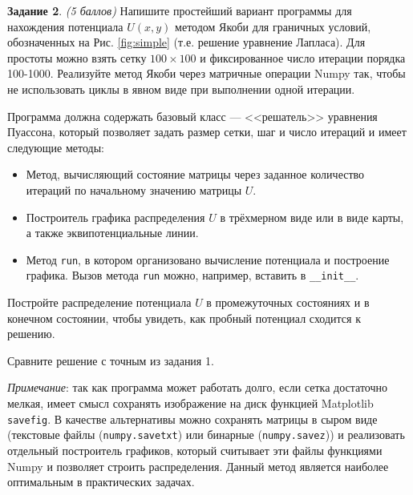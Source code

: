 \documentclass[12pt]{article}
\newcommand{\task}[2]{\vspace{6pt}
\textbf{Задание #1}. #2 \vspace{6pt}}
\begin{document}
\task{2}{\textit{(5 баллов)} Напишите простейший вариант программы для нахождения потенциала $U(x,y)$ методом Якоби для граничных условий, обозначенных на Рис. \ref{fig:simple} (т.е. решение уравнение Лапласа). Для простоты можно взять сетку $100\times 100$ и  фиксированное число итерации порядка 100-1000. Реализуйте метод Якоби через матричные операции Numpy так, чтобы не использовать циклы в явном виде при выполнении одной итерации.

Программа должна содержать базовый класс --- <<решатель>> уравнения Пуассона, который позволяет задать размер сетки, шаг и число итераций и имеет следующие методы:
\begin{itemize}
\item Метод, вычисляющий состояние матрицы через заданное количество итераций по начальному значению матрицы $U$.
\item Построитель графика распределения $U$ в трёхмерном виде или в виде карты, а также эквипотенциальные линии.
\item Метод \texttt{run}, в котором организовано вычисление потенциала и построение графика. Вызов метода \texttt{run} можно, например, вставить в \texttt{\_\_init\_\_}.
\end{itemize}

Постройте распределение потенциала $U$ в промежуточных состояниях и в конечном состоянии, чтобы увидеть, как пробный потенциал сходится к решению. 

Сравните решение с точным из задания 1.

\textit{Примечание}: так как программа может работать долго, если сетка достаточно мелкая, имеет смысл сохранять изображение на диск функцией Matplotlib \texttt{savefig}. В качестве альтернативы можно сохранять матрицы в сыром виде (текстовые файлы (\texttt{numpy.savetxt}) или бинарные (\texttt{numpy.savez})) и реализовать отдельный построитель графиков, который считывает эти файлы функциями Numpy и позволяет строить распределения. Данный метод является наиболее оптимальным в практических задачах.
}
\end{document}
